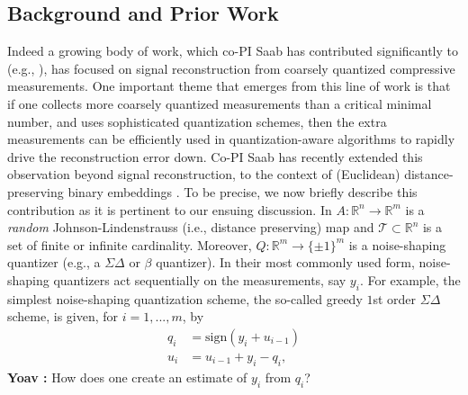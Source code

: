 \documentclass{article}
\newcommand{\comment}[3]{{\color{#1} {\bf #2 :} #3}}
\newcommand{\yoav}[1]{\comment{magenta}{Yoav}{#1}}
\newcommand{\R}{\mathbb{R}}
\newcommand{\sign}{\mathrm{sign}}
\begin{document}
\subsection{Background and Prior Work}Indeed a growing body of work, which co-PI Saab has contributed significantly to (e.g., \cite{SaabIEEEIT,knudson2016one,saab2018quantization,LybrandSaab2018,iwen2019new}), has focused on signal reconstruction from coarsely quantized compressive measurements. One important theme that emerges from this line of work  is that if one collects more coarsely quantized measurements than a critical minimal number, and uses sophisticated quantization schemes, then the extra measurements can be efficiently used in quantization-aware algorithms to rapidly drive the reconstruction error down.
Co-PI Saab has recently  extended this observation  beyond signal reconstruction, to the context of (Euclidean) distance-preserving binary embeddings \cite{huynh2018fast}. To be precise, we now briefly describe this contribution as it is pertinent to our ensuing discussion. In \cite{huynh2018fast}  $A: \R^n \to \R^m$ is a \emph{random} Johnson-Lindenstrauss (i.e., distance preserving) map and  $\mathcal{T}\subset \R^n$ is a set of finite or infinite cardinality. Moreover, $Q:\R^m \to \{\pm 1\}^m$ is a noise-shaping quantizer (e.g., a $\Sigma\Delta$ \cite{stuff} or $\beta$ \cite{stuff} quantizer). In their most commonly used form, noise-shaping quantizers act sequentially on the measurements, say $y_i$. For example, the simplest noise-shaping quantization scheme, the so-called greedy $1$st order $\Sigma\Delta$ scheme, is given, for $i=1,...,m$, by 
\begin{align}
    q_i &= \sign(y_i+u_{i-1})\\
    u_i &= u_{i-1} + y_i -q_i,
\end{align}
\yoav{How does one create an estimate of $y_i$ from $q_i$?}
\end{document}
